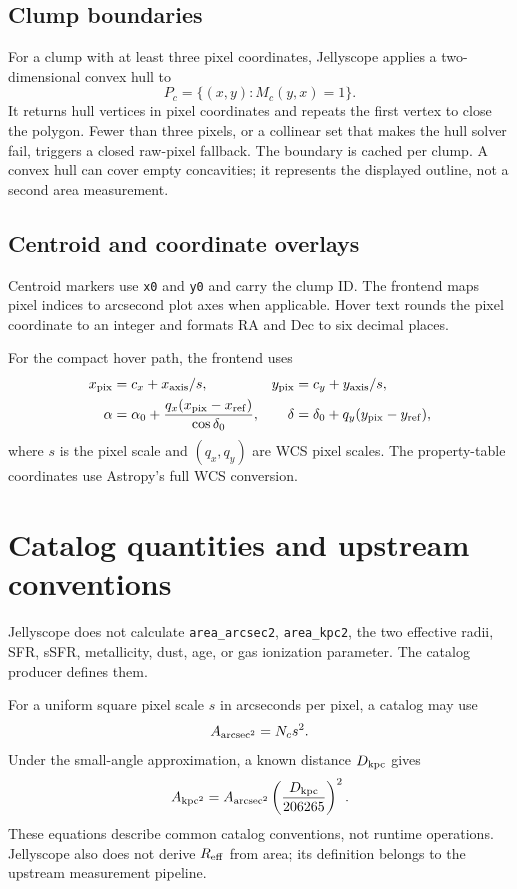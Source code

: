 \documentclass[11pt]{article}
\newcommand{\code}[1]{\texttt{#1}}
\begin{document}
\subsection{Clump boundaries}
For a clump with at least three pixel coordinates, Jellyscope applies a two-dimensional convex hull to
\begin{equation}
 P_c = \{(x,y) : M_c(y,x)=1\}.
\end{equation}
It returns hull vertices in pixel coordinates and repeats the first vertex to close the polygon. Fewer than three pixels, or a collinear set that makes the hull solver fail, triggers a closed raw-pixel fallback. The boundary is cached per clump. A convex hull can cover empty concavities; it represents the displayed outline, not a second area measurement.
\subsection{Centroid and coordinate overlays}
Centroid markers use \code{x0} and \code{y0} and carry the clump ID. The frontend maps pixel indices to arcsecond plot axes when applicable. Hover text rounds the pixel coordinate to an integer and formats RA and Dec to six decimal places.

For the compact hover path, the frontend uses
\begin{align}
 x_{\rm pix} &= c_x + x_{\rm axis}/s, & y_{\rm pix} &= c_y + y_{\rm axis}/s, \\
 \alpha &= \alpha_0 + {q_x(x_{\rm pix}-x_{\rm ref})\over \cos\delta_0}, & \delta &= \delta_0 + q_y(y_{\rm pix}-y_{\rm ref}),
\end{align}
where $s$ is the pixel scale and $(q_x,q_y)$ are WCS pixel scales. The property-table coordinates use Astropy's full WCS conversion.
\section{Catalog quantities and upstream conventions}
Jellyscope does not calculate \code{area\_arcsec2}, \code{area\_kpc2}, the two effective radii, SFR, sSFR, metallicity, dust, age, or gas ionization parameter. The catalog producer defines them.

For a uniform square pixel scale $s$ in arcseconds per pixel, a catalog may use
\begin{equation}
 A_{\rm arcsec^2} = N_c s^2.
\end{equation}
Under the small-angle approximation, a known distance $D_{\rm kpc}$ gives
\begin{equation}
 A_{\rm kpc^2} = A_{\rm arcsec^2}\left({D_{\rm kpc}\over 206265}\right)^2.
\end{equation}
These equations describe common catalog conventions, not runtime operations. Jellyscope also does not derive $R_{\rm eff}$ from area; its definition belongs to the upstream measurement pipeline.
\end{document}
